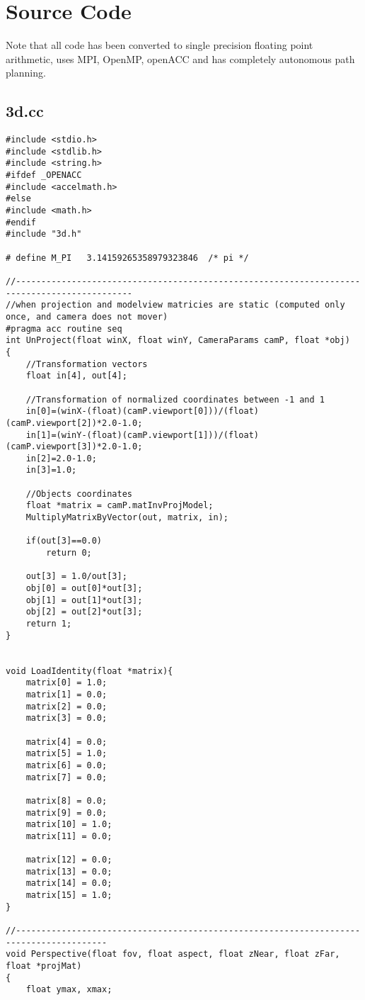 \documentclass[]{article}
\begin{document}
\section*{Source Code}
Note that all code has been converted to single precision floating point arithmetic, uses MPI,  OpenMP, openACC and has completely autonomous path planning.

\subsection*{3d.cc}
\begin{Verbatim}[fontsize= \footnotesize, tabsize=4]
#include <stdio.h>
#include <stdlib.h>
#include <string.h>
#ifdef _OPENACC
#include <accelmath.h>
#else
#include <math.h>
#endif
#include "3d.h"

# define M_PI   3.14159265358979323846  /* pi */

//---------------------------------------------------------------------------------------------
//when projection and modelview matricies are static (computed only once, and camera does not mover)
#pragma acc routine seq
int UnProject(float winX, float winY, CameraParams camP, float *obj)
{
	//Transformation vectors
	float in[4], out[4];
	
	//Transformation of normalized coordinates between -1 and 1
	in[0]=(winX-(float)(camP.viewport[0]))/(float)(camP.viewport[2])*2.0-1.0;
	in[1]=(winY-(float)(camP.viewport[1]))/(float)(camP.viewport[3])*2.0-1.0;
	in[2]=2.0-1.0;
	in[3]=1.0;
	
	//Objects coordinates
	float *matrix = camP.matInvProjModel;
	MultiplyMatrixByVector(out, matrix, in);
	
	if(out[3]==0.0)
		return 0;

	out[3] = 1.0/out[3];
	obj[0] = out[0]*out[3];
	obj[1] = out[1]*out[3];
	obj[2] = out[2]*out[3];
	return 1;
}


void LoadIdentity(float *matrix){
	matrix[0] = 1.0;
	matrix[1] = 0.0;
	matrix[2] = 0.0;
	matrix[3] = 0.0;
	
	matrix[4] = 0.0;
	matrix[5] = 1.0;
	matrix[6] = 0.0;
	matrix[7] = 0.0;

	matrix[8] = 0.0;
	matrix[9] = 0.0;
	matrix[10] = 1.0;
	matrix[11] = 0.0;
	
	matrix[12] = 0.0;
	matrix[13] = 0.0;
	matrix[14] = 0.0;
	matrix[15] = 1.0;
}

//----------------------------------------------------------------------------------------
void Perspective(float fov, float aspect, float zNear, float zFar, float *projMat)
{
	float ymax, xmax;
	

\end{Verbatim}
\end{document}
